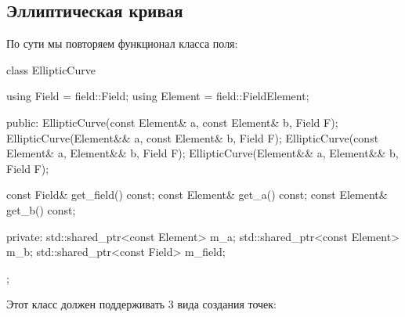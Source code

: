 \subsection{Эллиптическая кривая}
По сути мы повторяем функционал класса поля:
\begin{cppcode}
class EllipticCurve {
    using Field = field::Field;
    using Element = field::FieldElement;

public:
    EllipticCurve(const Element& a, const Element& b, Field F);
    EllipticCurve(Element&& a, const Element& b, Field F);
    EllipticCurve(const Element& a, Element&& b, Field F);
    EllipticCurve(Element&& a, Element&& b, Field F);

    const Field& get_field() const;
    const Element& get_a() const;
    const Element& get_b() const;

private:
    std::shared_ptr<const Element> m_a;
    std::shared_ptr<const Element> m_b;
    std::shared_ptr<const Field> m_field;
};
\end{cppcode}
Этот класс должен поддерживать 3 вида создания точек:
